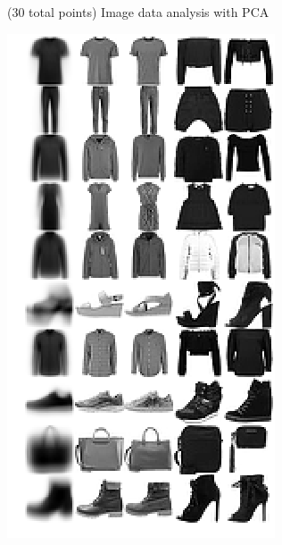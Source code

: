 \documentclass[12pt]{article}
\begin{document}
\begin{question}{(30 total points) Image data analysis with PCA}
\begin{subquestion}
  \begin{answerbox}{52em}
    \begin{center}
	\includegraphics[width=\textwidth]{imgs/1_2.png}
	\end{center}
  \end{answerbox}



   \end{subquestion}


\end{question}
\end{document}
